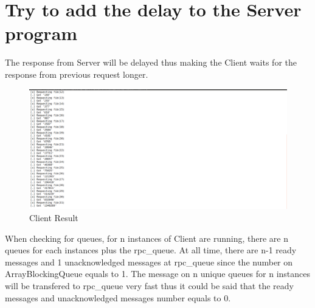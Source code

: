 \documentclass[11pt,a4paper]{article}
\begin{document}
	\section{Try to add the delay to the Server program}
	The response from Server will be delayed thus making the Client waits for the response from previous request longer.\newpage
	\begin{figure}[t]
  		\includegraphics[width=\linewidth]{res-client.png}
  		\caption{Client Result}
  		\label{fig:res-client}
	\end{figure}
	When checking for queues, for n instances of Client are running, there are n queues for each instances plus the rpc\_queue. At all time, there are n-1 ready messages and 1 unacknowledged messages at rpc\_queue since the number on ArrayBlockingQueue equals to 1. The message on n unique queues for n instances will be transfered to rpc\_queue very fast thus it could be said that the ready messages and unacknowledged messages number equals to 0.
\end{document}

